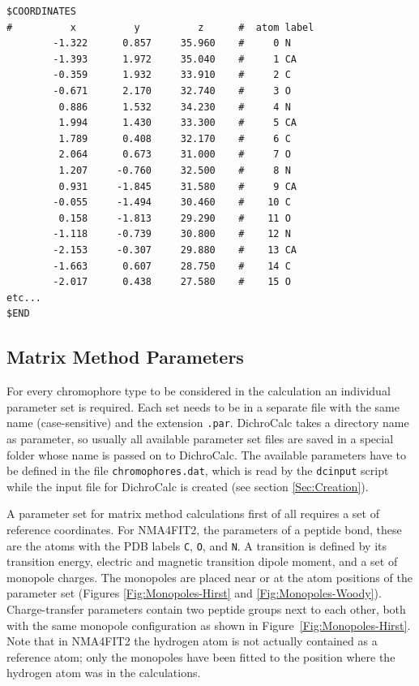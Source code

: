 \documentclass[11pt, letterpaper]{article}
\begin{document}
\begin{verbatim}
$COORDINATES
#          x          y          z      #  atom label
        -1.322      0.857     35.960    #     0 N
        -1.393      1.972     35.040    #     1 CA
        -0.359      1.932     33.910    #     2 C
        -0.671      2.170     32.740    #     3 O
         0.886      1.532     34.230    #     4 N
         1.994      1.430     33.300    #     5 CA
         1.789      0.408     32.170    #     6 C
         2.064      0.673     31.000    #     7 O
         1.207     -0.760     32.500    #     8 N
         0.931     -1.845     31.580    #     9 CA
        -0.055     -1.494     30.460    #    10 C
         0.158     -1.813     29.290    #    11 O
        -1.118     -0.739     30.800    #    12 N
        -2.153     -0.307     29.880    #    13 CA
        -1.663      0.607     28.750    #    14 C
        -2.017      0.438     27.580    #    15 O
etc...
$END
\end{verbatim}





\subsection{Matrix Method Parameters}
\label{Sec:MatrixMethodParameters}

For every chromophore type to be considered in the calculation an individual parameter set is required. Each set needs to be in a separate file with the same name (case-sensitive) and the extension \verb'.par'. DichroCalc takes a directory name as parameter, so usually all available parameter set files are saved in a special folder whose name is passed on to DichroCalc. The available parameters have to be defined in the file \verb'chromophores.dat', which is read by the \verb'dcinput' script while the input file for DichroCalc is created (see section \ref{Sec:Creation}).

A parameter set for matrix method calculations first of all requires a set of reference coordinates. For NMA4FIT2,\cite{Besley:99:9636} the parameters of a peptide bond, these are the atoms with the PDB labels \verb'C', \verb'O', and \verb'N'. A transition is defined by its transition energy, electric and magnetic transition dipole moment, and a set of monopole charges. The monopoles are placed near or at the atom positions of the parameter set (Figures \ref{Fig:Monopoles-Hirst} and \ref{Fig:Monopoles-Woody}). Charge-transfer parameters contain two peptide groups next to each other, both with the same monopole configuration as shown in Figure~\ref{Fig:Monopoles-Hirst}. Note that in NMA4FIT2 the hydrogen atom is not actually contained as a reference atom; only the monopoles have been fitted to the position where the hydrogen atom was in the calculations.
\end{document}
